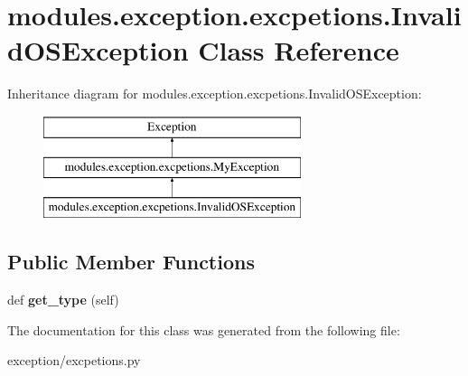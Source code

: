 \hypertarget{classmodules_1_1exception_1_1excpetions_1_1_invalid_o_s_exception}{}\section{modules.\+exception.\+excpetions.\+Invalid\+O\+S\+Exception Class Reference}
\label{classmodules_1_1exception_1_1excpetions_1_1_invalid_o_s_exception}
Inheritance diagram for modules.\+exception.\+excpetions.\+Invalid\+O\+S\+Exception\+:\begin{figure}[H]
\begin{center}
\leavevmode
\includegraphics[height=3.000000cm]{classmodules_1_1exception_1_1excpetions_1_1_invalid_o_s_exception}
\end{center}
\end{figure}
\subsection*{Public Member Functions}
\begin{DoxyCompactItemize}
\item 
\mbox{\label{classmodules_1_1exception_1_1excpetions_1_1_invalid_o_s_exception_a47bfccb10f0c4162ad075d47f7e252e3}} 
def {\bfseries get\+\_\+type} (self)
\end{DoxyCompactItemize}


The documentation for this class was generated from the following file\+:\begin{DoxyCompactItemize}
\item 
exception/excpetions.\+py\end{DoxyCompactItemize}
